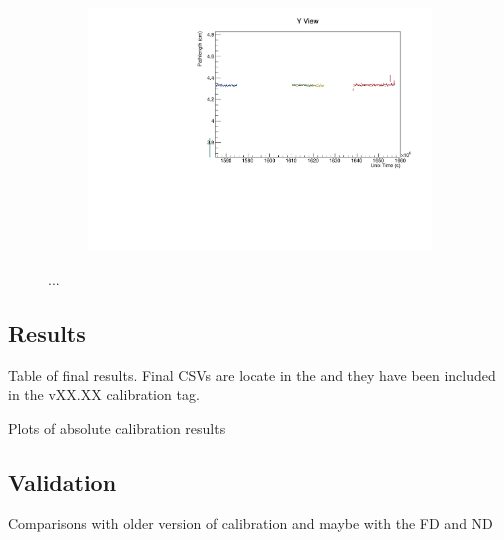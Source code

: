 \documentclass[12pt,a4paper]{article}
\begin{document}
\begin{figure}[!ht]
\begin{subfigure}{0.5\textwidth}
  \end{subfigure}
  \begin{subfigure}{0.5\textwidth}
    \includegraphics[width=\linewidth]{driftsec_tb/cm_time_y.pdf}
  \end{subfigure}
  \caption{...}
  \label{figAbsCalibDrift2}
\end{figure}

\subsection{Results}
Table of final results.
Final CSVs are locate in the  and they have been included in the vXX.XX calibration tag.

Plots of absolute calibration results

\subsection{Validation}
Comparisons with older version of calibration and maybe with the FD and ND




\end{document}
